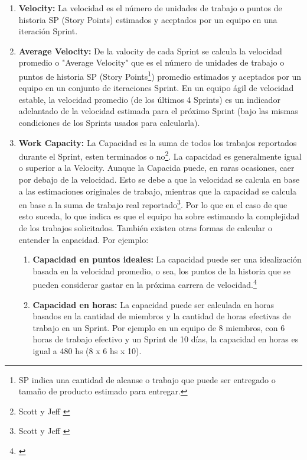 \begin{enumerate}

\item {\textbf{Velocity:} La velocidad es el número de unidades de trabajo o puntos de historia SP (Story Points) estimados y aceptados por un equipo en una iteración Sprint.}

\item {\textbf{Average Velocity:} De la valocity de cada Sprint se calcula la velocidad promedio o "Average Velocity" que es el número de unidades de trabajo o puntos de historia SP (Story Points\footnote{SP indica una cantidad de alcanse o trabajo que puede ser entregado o tamaño de producto estimado para entregar.}) promedio estimados y aceptados por un equipo en un conjunto de iteraciones Sprint. En un equipo ágil de velocidad estable, la velocidad promedio (de los últimos 4 Sprints) es un indicador adelantado de la velocidad estimada para el próximo Sprint (bajo las mismas condiciones de los Sprints usados para calcularla).}

\item {\textbf{Work Capacity:} La Capacidad es la suma de todos los trabajos reportados durante el Sprint, esten terminados o no\footnote{Scott y Jeff \cite{Scott-Jeff-2013}}. La capacidad es generalmente igual o superior a la Velocity. Aunque la Capacida puede, en raras ocasiones, caer por debajo de la velocidad. Esto se debe a que la velocidad se calcula en base a las estimaciones originales de trabajo, mientras que la capacidad se calcula en base a la suma de trabajo real reportado\footnote{Scott y Jeff \cite{Scott-Jeff-2013}}. Por lo que en el caso de que esto suceda, lo que indica es que el equipo ha sobre estimando la complejidad de los trabajos solicitados. También existen otras formas de calcular o entender la capacidad. Por ejemplo:

  \begin{enumerate}
  \item {\textbf{Capacidad en puntos ideales:} La capacidad puede ser una idealización basada en la velocidad promedio, o sea, los puntos de la historia que se pueden considerar gastar en la próxima carrera de velocidad.\footnote{\cite{Satish-Thatte-2013}}}

  \item {\textbf{Capacidad en horas:} La capacidad puede ser calculada en horas basados en la cantidad de miembros y la cantidad de horas efectivas de trabajo en un Sprint. Por ejemplo en un equipo de 8 miembros, con 6 horas de trabajo efectivo y un Sprint de 10 días, la capacidad en horas es igual a 480 hs (8 x 6 hs x 10).}


\end{enumerate}}
\end{enumerate}

